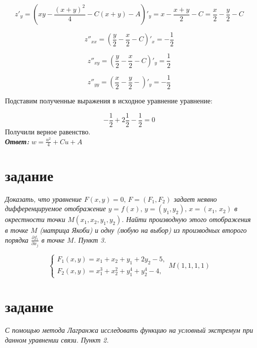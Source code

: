 \documentclass[a5paper, 10pt]{article}
\theoremstyle{definition}
\theoremstyle{plain}
\theoremstyle{remark}
\begin{document}
\begin{equation}
z'_y = \left(  xy -  \frac{( x + y)^2}{4} - C( x + y) - A \right)'_y = x - \frac{ x + y}{2}  -C = \frac{x}{2} - \frac{y}{2} -C
\end{equation}

\begin{equation}
z''_{xx} = \left(  \frac{y}{2} - \frac{ x}{2} -C \right)'_x =  - \frac{ 1}{2}
\end{equation}

\begin{equation}
z''_{xy} = \left(  \frac{y}{2} - \frac{ x}{2} -C \right)'_y =   \frac{ 1}{2}
\end{equation}

\begin{equation}
z''_{yy} = \left(  \frac{x}{2} - \frac{y}{2} - \right)'_y =  - \frac{ 1}{2}
\end{equation}

Подставим полученные выражения в исходное уравнение уравнение:

\begin{equation}
- \frac{ 1}{2} + 2\frac{ 1}{2} - \frac{ 1}{2} = 0
\end{equation}
Получили верное равенство.\\

\textit{\textbf{Ответ:}} $ w =  \frac{u^2}{4} + Cu + A $


\newpage

\section{задание}
\textit{Доказать, что уравнение $F(x,y)=0, \, F=(F_1, F_2)$ задает неявно дифференцируемое отображение $y=f(x), \, y=(y_1, y_2), \, x = (x_1, \, x_2)$ в окрестности точки $M(x_1, x_2, y_1, y_2)$. Найти производную этого отображения в точке $M$ (матрица Якоби) и одну (любую на выбор) из производных второго порядка $\frac{\partial f_i}{\partial x_j}$ в точке $M$. Пункт 3.}

\begin{equation}
\begin{cases}
F_1 (x, y) = x_1 + x_2 + y_1 + 2y_2 -5,\\
F_2 (x, y) = x^3_1 + x^2_2 +y^4_1+y^4_2-4,
\end{cases}
M(1, 1, 1, 1)
\end{equation}


\newpage

\section{задание}
\textit{С помощью метода Лагранжа исследовать функцию на условный экстремум при данном уравнении связи. Пункт 2.}
\end{document}
